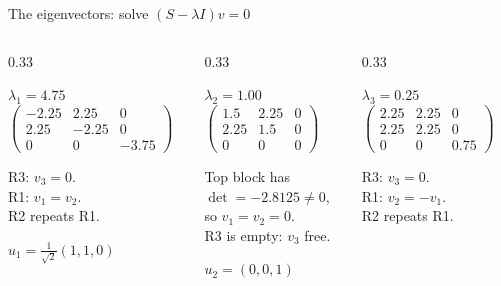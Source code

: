 \documentclass[aspectratio=169]{beamer}
\begin{document}
\begin{frame}[shrink=10]{The eigenvectors: solve $(S - \lambda I)v = 0$}
  \begin{columns}[T]
    \begin{column}{0.33\textwidth}
      \begin{block}{$\lambda_1 = 4.75$}
        \footnotesize
        $\begin{pmatrix}-2.25&2.25&0\\2.25&-2.25&0\\0&0&-3.75\end{pmatrix}$
        \smallskip

        R3: $v_3 = 0$.\\
        R1: $v_1 = v_2$.\\
        R2 repeats R1.
        \smallskip

        $u_1 = \tfrac{1}{\sqrt2}(1,1,0)$
      \end{block}
    \end{column}
    \begin{column}{0.33\textwidth}
      \begin{block}{$\lambda_2 = 1.00$}
        \footnotesize
        $\begin{pmatrix}1.5&2.25&0\\2.25&1.5&0\\0&0&0\end{pmatrix}$
        \smallskip

        Top block has\\ $\det = -2.8125 \ne 0$,\\ so $v_1 = v_2 = 0$.\\
        R3 is empty: $v_3$ free.
        \smallskip

        $u_2 = (0,0,1)$
      \end{block}
    \end{column}
    \begin{column}{0.33\textwidth}
      \begin{block}{$\lambda_3 = 0.25$}
        \footnotesize
        $\begin{pmatrix}2.25&2.25&0\\2.25&2.25&0\\0&0&0.75\end{pmatrix}$
        \smallskip

        R3: $v_3 = 0$.\\
        R1: $v_2 = -v_1$.\\
        R2 repeats R1.
        \smallskip


\end{block}
\end{column}
\end{columns}
\end{frame}
\end{document}
